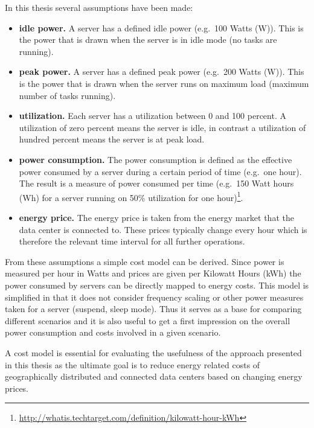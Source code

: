 In this thesis several assumptions have been made: 

\begin{itemize}

\item \textbf{idle power.} A server has a defined idle power (e.g.~100 Watts (W)). This is the power that is drawn when the server is in idle mode (no tasks are running). 

\item \textbf{peak power.} A server has a defined peak power (e.g.~200 Watts (W)). This is the power that is drawn when the server runs on maximum load (maximum number of tasks running). 

\item \textbf{utilization.} Each server has a utilization between 0 and 100 percent. A utilization of zero percent means the server is idle, in contrast a utilization of hundred percent means the server is at peak load. 

\item \textbf{power consumption.} The power consumption is defined as the effective power consumed by a server during a certain period of time (e.g.~one hour). The result is a measure of power consumed per time (e.g.~150 Watt hours (Wh) for a server running on 50\% utilization for one hour)\footnote{\url{http://whatis.techtarget.com/definition/kilowatt-hour-kWh}}. %

\item \textbf{energy price.} The energy price is taken from the energy market that the data center is connected to. These prices typically change every hour which is therefore the relevant time interval for all further operations. 

\end{itemize}

From these assumptions a simple cost model can be derived. Since power is measured per hour in Watts and prices are given per Kilowatt Hours (kWh) the power consumed by servers can be directly mapped to energy costs. This model is simplified in that it does not consider frequency scaling or other power measures taken for a server (suspend, sleep mode). Thus it serves as a base for comparing different scenarios and it is also useful to get a first impression on the overall power consumption and costs involved in a given scenario. 

A cost model is essential for evaluating the usefulness of the approach presented in this thesis as the ultimate goal is to reduce energy related costs of geographically distributed and connected data centers based on changing energy prices. 




